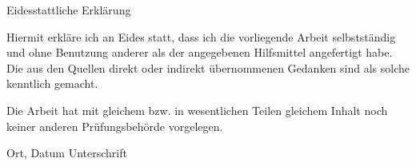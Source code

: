 Eidesstattliche Erklärung

\vspace{2cm}

Hiermit erkläre ich an Eides statt, dass ich die vorliegende Arbeit
selbstständig und ohne Benutzung anderer als der angegebenen Hilfsmittel
angefertigt habe. Die aus den Quellen direkt oder indirekt übernommenen
Gedanken sind als solche kenntlich gemacht.

\vspace{1cm}

Die Arbeit hat mit gleichem bzw. in wesentlichen Teilen gleichem Inhalt noch
keiner anderen Prüfungsbehörde vorgelegen.

\vspace{4cm}

Ort, Datum \hspace{5cm} Unterschrift

